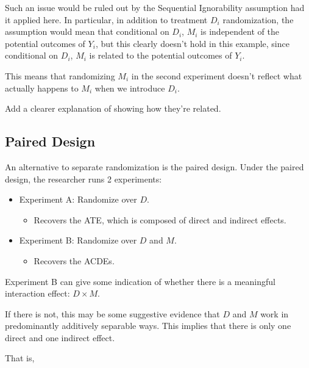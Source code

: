 \documentclass[10pt]{article}
\begin{document}
Such an issue would be ruled out by 
the Sequential Ignorability assumption had it applied here.
In particular, in addition to treatment $D_i$ randomization, 
the assumption would mean that 
conditional on $D_i$, $M_i$ is independent of the potential outcomes 
of $Y_i$, but this clearly doesn't hold in this example, since 
conditional on $D_i$, 
$M_i$ is related to the potential outcomes of $Y_i$.

This means that randomizing $M_i$ in the second experiment 
doesn't reflect what actually happens to $M_i$ when we introduce 
$D_i$.

\begin{questions}[To-Do]
    Add a clearer explanation of showing how they're related.
\end{questions}

\subsection{Paired Design}

An alternative to separate randomization is 
the paired design. Under the paired design, 
the researcher runs 2 experiments:

\begin{itemize}
    \item Experiment A: Randomize over $D$.
        \begin{itemize}
            \item Recovers the ATE, which is composed of direct and indirect effects.
        \end{itemize}
    \item Experiment B: Randomize over $D$ and $M$.
        \begin{itemize}
            \item Recovers the ACDEs.
        \end{itemize}
\end{itemize}

Experiment B can give some indication of 
whether there is a meaningful 
interaction effect: $D \times M$.

If there is not, this may be some 
suggestive evidence that $D$ and $M$ 
work in predominantly additively separable ways. 
This implies that there is only one direct and one indirect effect.

That is, 
\end{document}
